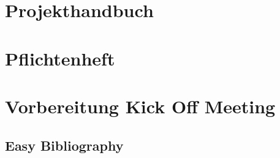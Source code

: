 \documentclass[12pt]{article}
\begin{document}
\section*{Projekthandbuch}
\section*{Pflichtenheft}
\section*{Vorbereitung Kick Off Meeting}




\newpage
\listoftables
\listoffigures
\subsection{Easy Bibliography}
\end{document}
